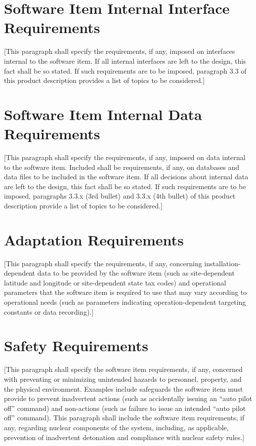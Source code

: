 \section{Software Item Internal Interface Requirements\label{ref-012}}

[This paragraph shall specify the requirements, if any, imposed on interfaces internal to the software item. If all internal interfaces are left to the design, this fact shall be so stated. If such requirements are to be imposed, paragraph 3.3 of this product description provides a list of topics to be considered.]

\section{Software Item Internal Data Requirements\label{ref-013}}

[This paragraph shall specify the requirements, if any, imposed on data internal to the software item. Included shall be requirements, if any, on databases and data files to be included in the software item. If all decisions about internal data are left to the design, this fact shall be so stated. If such requirements are to be imposed, paragraphs 3.3.x (3rd bullet) and 3.3.x (4th bullet) of this product description provide a list of topics to be considered.]

\section{Adaptation Requirements\label{ref-014}}

[This paragraph shall specify the requirements, if any, concerning installation-dependent data to be provided by the software item (such as site-dependent latitude and longitude or site-dependent state tax codes) and operational parameters that the software item is required to use that may vary according to operational needs (such as parameters indicating operation-dependent targeting constants or data recording).]

\section{Safety Requirements\label{ref-015}}

[This paragraph shall specify the software item requirements, if any, concerned with preventing or minimizing unintended hazards to personnel, property, and the physical environment. Examples include safeguards the software item must provide to prevent inadvertent actions (such as accidentally issuing an ``auto pilot off'' command) and non-actions (such as failure to issue an intended ``auto pilot off'' command). This paragraph shall include the software item requirements, if any, regarding nuclear components of the system, including, as applicable, prevention of inadvertent detonation and compliance with nuclear safety rules.]

